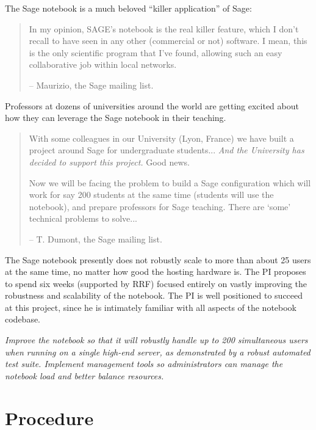 \documentclass[11pt]{article}
\begin{document}
The Sage notebook is a much beloved ``killer application'' of Sage:
\begin{quote}
  In my opinion, SAGE's notebook is the real killer feature, which I
  don't recall to have seen in any other (commercial or not)
  software. I mean, this is the only scientific program that I've
  found, allowing such an easy collaborative job within local
  networks.

 -- Maurizio, the Sage mailing list.
\end{quote}

Professors at dozens of universities around the world are getting
excited about how they can leverage the Sage notebook in their
teaching.
\begin{quote}
With some colleagues in our University (Lyon, France) we have built a
project around Sage for undergraduate students... {\em And the University has
decided to support this project.} Good news.

Now we will be facing the problem to build a Sage configuration which
will work for say 200 students at the same time (students will use the
notebook), and prepare professors for Sage teaching. There are `some'
technical problems to solve...
 
-- T. Dumont, the Sage mailing list.
\end{quote}

The Sage notebook presently does not robustly scale to more than about
25 users at the same time, no matter how good the hosting hardware is.
The PI proposes to spend six weeks (supported by RRF) focused entirely
on vastly improving the robustness and scalability of the notebook.
The PI is well positioned to succeed at this project, since he is
intimately familiar with all aspects of the notebook codebase.

\vspace{2ex}
 {\em Improve the notebook so that it
  will robustly handle up to 200 simultaneous users when running on a
  single high-end server, as demonstrated by a robust automated test
  suite.  Implement management tools so administrators can manage the
  notebook load and better balance resources.}

\section{Procedure}

\end{document}
